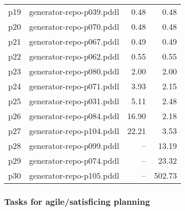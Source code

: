 \documentclass{article}
\begin{document}
\begin{center}
\begin{tabular}{@{}l|r|r|r@{}}
  p19& generator-repo-p039.pddl&0.48&0.48\\
  p20& generator-repo-p070.pddl&0.48&0.48\\
  p21& generator-repo-p067.pddl&0.49&0.49\\
  p22& generator-repo-p062.pddl&0.55&0.55\\
  p23& generator-repo-p080.pddl&2.00&2.00\\
  p24& generator-repo-p071.pddl&3.93&2.15\\
  p25& generator-repo-p031.pddl&5.11&2.48\\
  p26& generator-repo-p084.pddl&16.90&2.18\\
  p27& generator-repo-p104.pddl&22.21&3.53\\
  p28& generator-repo-p099.pddl&--&13.19\\
  p29& generator-repo-p074.pddl&--&23.32\\
  p30& generator-repo-p105.pddl&--&502.73
                            \end{tabular}
                            \end{center}
                    

                    \subsubsection*{Tasks for agile/satisficing planning}
                    
\end{document}
